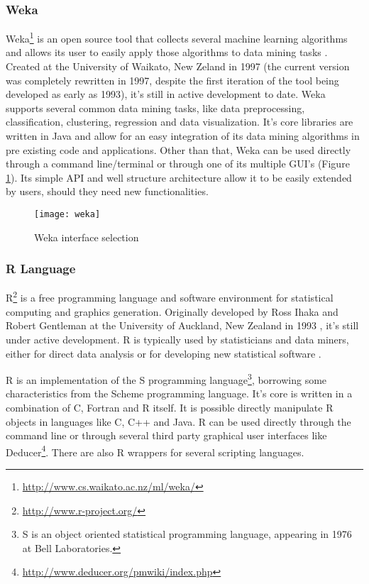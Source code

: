 \subsubsection{Weka}

Weka\footnote{\url{http://www.cs.waikato.ac.nz/ml/weka/}} is an open source tool that
collects several machine learning algorithms and allows its user to easily apply
those algorithms to data mining tasks \cite{Hall}. Created at the University of
Waikato, New Zeland in 1997 (the current version was completely rewritten in
1997, despite the first iteration of the tool being developed as early as 1993),
it's still in active development to date. Weka supports several common data
mining tasks, like data preprocessing, classification, clustering, regression
and data visualization. It's core libraries are written in Java and allow for an
easy integration of its data mining algorithms in pre existing code and
applications. Other than that, Weka can be used directly through a command
line/terminal or through one of its multiple GUI's (Figure \ref{fig:weka}). Its
simple API and well structure architecture allow it to be easily extended by
users, should they need new functionalities.

\begin{figure}[!htb]
  \begin{center}
    \leavevmode
    \texttt{[image: weka]}
    \caption{Weka interface selection}
    \label{fig:weka}
  \end{center}
\end{figure}

\subsubsection{R Language}

R\footnote{\url{http://www.r-project.org/}} is a free programming language and
software environment for statistical computing and graphics generation.
Originally developed by Ross Ihaka and Robert Gentleman at the University of
Auckland, New Zealand in 1993 \cite{Ihaka1998}, it's still under active
development. R is typically used by statisticians and data miners, either for
direct data analysis or for developing new statistical software \cite{Fox2005}.

R is an implementation of the S programming language\footnote{S is an object
oriented statistical programming language, appearing in 1976 at Bell
Laboratories.}, borrowing some characteristics from the Scheme programming
language. It's core is written in a combination of C, Fortran and R itself. It
is possible directly manipulate R objects in languages like C, C++ and Java. R
can be used directly through the command line or through several third party
graphical user interfaces like
Deducer\footnote{\url{http://www.deducer.org/pmwiki/index.php}}. There are also
R wrappers for several scripting languages.

